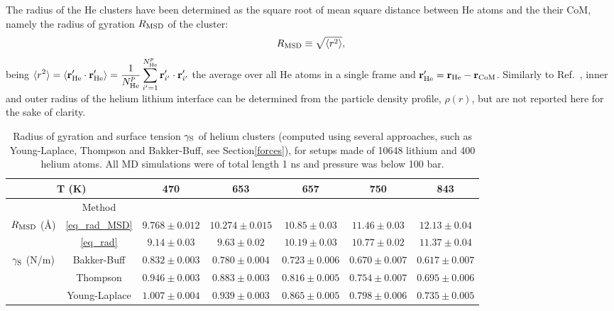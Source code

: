 \documentclass[jcp,amsmath,amssymb,preprint]{revtex4-1}
\begin{document}
The radius of the He clusters have been determined as the square root of mean square distance between He atoms and the their CoM, namely the radius of gyration $R_{\rm MSD}$ of the cluster: 
\begin{equation} \label{eq_rad_MSD}
    R_{\rm MSD} \equiv \sqrt{\langle r^2 \rangle},    
\end{equation}
being $\displaystyle \langle r^2 \rangle = \langle {\bf r}'_{\rm He} \cdot {\bf r}'_{\rm He}\rangle = \frac{1}{N_{\rm He}^p} \sum_{i'=1}^{N_{\rm He}^p}  {\bf r}'_{i'} \cdot {\bf r}'_{i'}$ the average over all He atoms in a single frame and ${\bf r}'_{\rm He} = {\bf r}_{\rm He} - {\bf r}_{\rm CoM}$.  Similarly to Ref.~\cite{cui2015molecular}, inner and outer radius of the helium lithium interface can be determined from the particle density profile, $\rho (r)$, but are not reported here for the sake of clarity.

\begin{table}
\caption{Radius of gyration and surface tension $\gamma_{\rm S}$ of helium clusters (computed using several approaches,  such as Young-Laplace, Thompson and Bakker-Buff,  see Section\ref{forces}),  for setups made of 10648 lithium and 400 helium atoms. All MD simulations were of total length 1 ns and pressure was below 100 bar.}
        \centering
            \begin{tabular}{c|c|ccccc}
            \toprule
            \multicolumn{2}{c|}{T (K)} & 470 & 653 & 657 & 750 & 843 \\ \hline \hline
            ~ & Method &\\ \hline
            \multirow{2}{*}{$R_{\rm MSD}$ (\AA)} & \ref{eq_rad_MSD} & $9.768 \pm 0.012$ & $10.274 \pm 0.015$ & $10.85 \pm 0.03$ & $11.46 \pm 0.03$ & $12.13 \pm 0.04$ \\
            ~ & \ref{eq_rad} & $9.14 \pm 0.03$ & $9.63 \pm 0.02$ & $10.19 \pm 0.03$ & $10.77 \pm 0.02$ & $11.37 \pm 0.04$ \\ \hline
             \multirow{3}{*}{$\gamma_{\rm S}$ (N/m)} & Bakker-Buff & $0.832 \pm 0.003$ & $0.780 \pm 0.004$ & $0.723 \pm 0.006$ & $0.670 \pm 0.007$ & $0.617 \pm 0.007$ \\
            ~ & Thompson & $0.946 \pm 0.003$ & $0.883 \pm 0.003$ & $0.816 \pm 0.005$ & $0.754 \pm 0.007$ & $0.695 \pm 0.006$ \\
            ~ & Young-Laplace & $1.007 \pm 0.004$ & $0.939 \pm 0.003$ & $0.865 \pm 0.005$ & $0.798 \pm 0.006$ & $0.735 \pm 0.005$ \\ \hline \hline
        \end{tabular}
        \label{tab_bubble_properties}
\end{table}        
\end{document}
